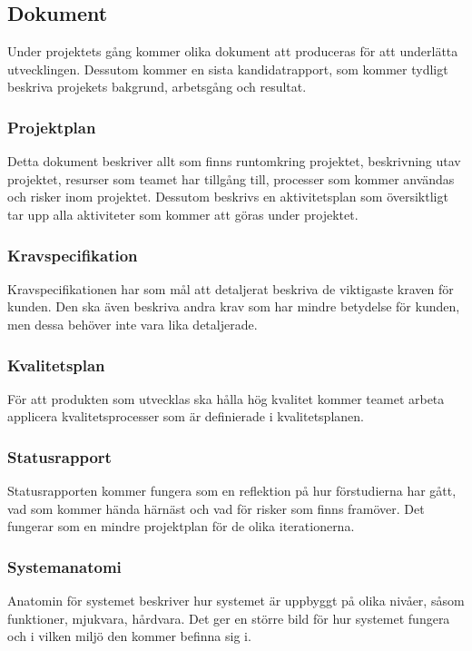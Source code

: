 \subsection{Dokument}
Under projektets gång kommer olika dokument att produceras för att underlätta utvecklingen.
Dessutom kommer en sista kandidatrapport, som kommer tydligt beskriva projekets bakgrund, arbetsgång och resultat.

\subsubsection*{Projektplan}
Detta dokument beskriver allt som finns runtomkring projektet, beskrivning utav projektet, 
resurser som teamet har tillgång till, processer som kommer användas och risker inom projektet.
Dessutom beskrivs en aktivitetsplan som översiktligt tar upp alla aktiviteter som kommer att
göras under projektet.

\subsubsection*{Kravspecifikation}
Kravspecifikationen har som mål att detaljerat beskriva de viktigaste kraven för kunden.
Den ska även beskriva andra krav som har mindre betydelse för kunden, men dessa behöver inte vara
lika detaljerade.

\subsubsection*{Kvalitetsplan}
För att produkten som utvecklas ska hålla hög kvalitet kommer teamet arbeta applicera kvalitetsprocesser som är definierade i kvalitetsplanen\cite{bib-kvalitetsplan}.

\subsubsection*{Statusrapport}
Statusrapporten kommer fungera som en reflektion på hur förstudierna har gått, vad som kommer
hända härnäst och vad för risker som finns framöver. Det fungerar som en mindre projektplan för
de olika iterationerna.

\subsubsection*{Systemanatomi}
Anatomin för systemet beskriver hur systemet är uppbyggt på olika nivåer, såsom funktioner, 
mjukvara, hårdvara. Det ger en större bild för hur systemet fungera och i vilken miljö den kommer
befinna sig i.

